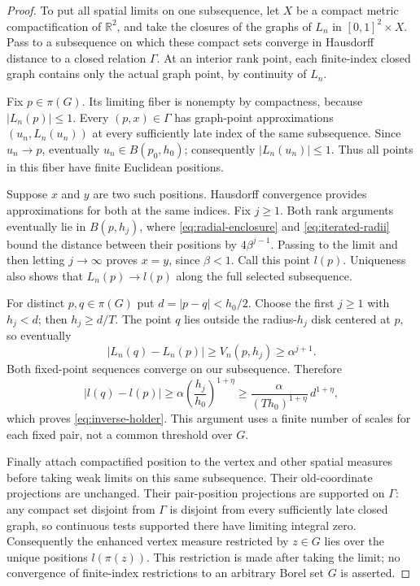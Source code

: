 \begin{proof}
To put all spatial limits on one subsequence, let $X$ be a compact metric
compactification of $\mathbb R^2$, and take the closures of the graphs
of $L_n$ in $[0,1]^2\times X$.  Pass to a subsequence on which these
compact sets converge in Hausdorff distance to a closed relation
$\Gamma$.  At an interior rank point, each finite-index closed graph
contains only the actual graph point, by continuity of $L_n$.

Fix $p\in\pi(G)$.  Its limiting fiber is nonempty by compactness,
because $|L_n(p)|\le1$.  Every $(p,x)\in\Gamma$ has graph-point
approximations $(u_n,L_n(u_n))$ at every sufficiently late index of the
same subsequence.  Since $u_n\to p$, eventually
$u_n\in B(p_0,h_0)$; consequently $|L_n(u_n)|\le1$.
Thus all points in this fiber have finite Euclidean positions.

Suppose $x$ and $y$ are two such positions.  Hausdorff convergence
provides approximations for both at the same indices.  Fix $j\ge1$.
Both rank arguments eventually lie in $B(p,h_j)$, where
\eqref{eq:radial-enclosure} and \eqref{eq:iterated-radii} bound the
distance between their positions by $4\beta^{j-1}$.  Passing to the limit
and then letting $j\to\infty$ proves $x=y$, since $\beta<1$.
Call this point $l(p)$.  Uniqueness also shows that $L_n(p)\to l(p)$
along the full selected subsequence.

For distinct $p,q\in\pi(G)$ put $d=|p-q|<h_0/2$.  Choose the first
$j\ge1$ with $h_j<d$; then $h_j\ge d/T$.  The point $q$ lies outside
the radius-$h_j$ disk centered at $p$, so eventually
\[
 |L_n(q)-L_n(p)|\ge V_n(p,h_j)\ge\alpha^{j+1}.
\]
Both fixed-point sequences converge on our subsequence.  Therefore
\[
 |l(q)-l(p)|\ge
 \alpha\left(\frac{h_j}{h_0}\right)^{1+\eta}
 \ge \frac{\alpha}{(Th_0)^{1+\eta}}\,d^{1+\eta},
\]
which proves \eqref{eq:inverse-holder}.  This argument uses a finite
number of scales for each fixed pair, not a common threshold over $G$.

Finally attach compactified position to the vertex and other spatial
measures before taking weak limits on this same subsequence.  Their
old-coordinate projections are unchanged.  Their pair-position
projections are supported on $\Gamma$: any compact set disjoint from
$\Gamma$ is disjoint from every sufficiently late closed graph, so
continuous tests supported there have limiting integral zero.
Consequently the enhanced vertex measure restricted by $z\in G$ lies
over the unique positions $l(\pi(z))$.  This restriction is made after
taking the limit; no convergence of finite-index restrictions to an
arbitrary Borel set $G$ is asserted.


\end{proof}
